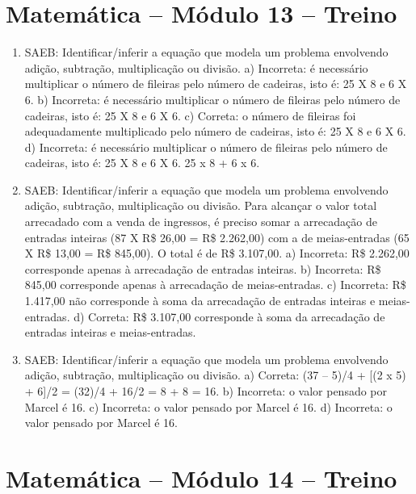\section*{Matemática -- Módulo 13 -- Treino}

\begin{enumerate}
\item
SAEB: Identificar/inferir a equação que modela um problema
envolvendo adição, subtração, multiplicação ou divisão.
a) Incorreta: é necessário multiplicar o número de fileiras
pelo número de cadeiras, isto é: 25 X 8 e 6 X 6. 
b) Incorreta: é necessário multiplicar o número de fileiras
pelo número de cadeiras, isto é: 25 X 8 e 6 X 6.  
c) Correta: o número de fileiras foi adequadamente multiplicado 
pelo número de cadeiras, isto é: 25 X 8 e 6 X 6. 
d) Incorreta: é necessário multiplicar o número de fileiras
pelo número de cadeiras, isto é: 25 X 8 e 6 X 6.  
25 x 8 + 6 x 6.

\item
SAEB: Identificar/inferir a equação que modela um problema
envolvendo adição, subtração, multiplicação ou divisão.
Para alcançar o valor total arrecadado com a 
venda de ingressos, é preciso somar a arrecadação de entradas inteiras
(87 X R\$ 26,00 = R\$ 2.262,00) com a de meias-entradas 
(65 X R\$ 13,00 = R\$ 845,00). O total é de R\$ 3.107,00. 
a) Incorreta: R\$ 2.262,00 corresponde apenas à arrecadação de entradas 
inteiras.  
b) Incorreta: R\$ 845,00 corresponde apenas à arrecadação de 
meias-entradas. 
c) Incorreta: R\$ 1.417,00 não corresponde à soma da arrecadação de 
entradas inteiras e meias-entradas.
d) Correta: R\$ 3.107,00 corresponde à soma da arrecadação de 
entradas inteiras e meias-entradas.

\item
SAEB: Identificar/inferir a equação que modela um problema
envolvendo adição, subtração, multiplicação ou divisão.
a) Correta: (37 -- 5)/4 + [(2 x 5) + 6]/2 = (32)/4 + 16/2 = 8 + 8 = 16.
b) Incorreta: o valor pensado por Marcel é 16.
c) Incorreta: o valor pensado por Marcel é 16.
d) Incorreta: o valor pensado por Marcel é 16.
\end{enumerate}

\section*{Matemática -- Módulo 14 -- Treino}

